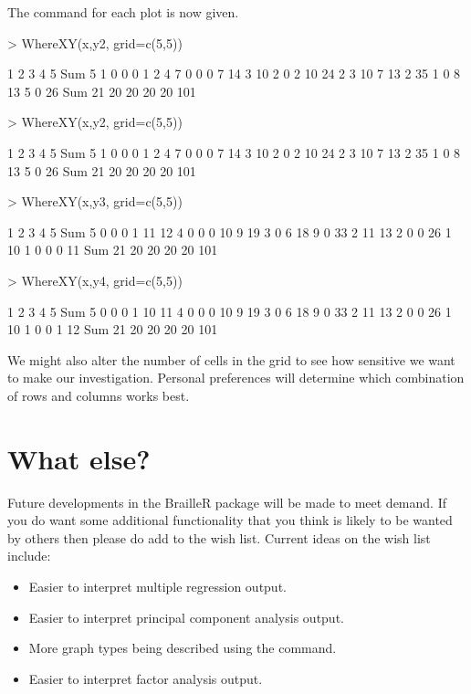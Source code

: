 The  command for each plot is now given.
\begin{Schunk}
\begin{Sinput}
> WhereXY(x,y2, grid=c(5,5))
\end{Sinput}
\begin{Soutput}
     1  2  3  4  5 Sum
5    1  0  0  0  1   2
4    7  0  0  0  7  14
3   10  2  0  2 10  24
2    3 10  7 13  2  35
1    0  8 13  5  0  26
Sum 21 20 20 20 20 101
\end{Soutput}
\begin{Sinput}
> WhereXY(x,y2, grid=c(5,5))
\end{Sinput}
\begin{Soutput}
     1  2  3  4  5 Sum
5    1  0  0  0  1   2
4    7  0  0  0  7  14
3   10  2  0  2 10  24
2    3 10  7 13  2  35
1    0  8 13  5  0  26
Sum 21 20 20 20 20 101
\end{Soutput}
\begin{Sinput}
> WhereXY(x,y3, grid=c(5,5))
\end{Sinput}
\begin{Soutput}
     1  2  3  4  5 Sum
5    0  0  0  1 11  12
4    0  0  0 10  9  19
3    0  6 18  9  0  33
2   11 13  2  0  0  26
1   10  1  0  0  0  11
Sum 21 20 20 20 20 101
\end{Soutput}
\begin{Sinput}
> WhereXY(x,y4, grid=c(5,5))
\end{Sinput}
\begin{Soutput}
     1  2  3  4  5 Sum
5    0  0  0  1 10  11
4    0  0  0 10  9  19
3    0  6 18  9  0  33
2   11 13  2  0  0  26
1   10  1  0  0  1  12
Sum 21 20 20 20 20 101
\end{Soutput}
\end{Schunk}

We might also alter the number of cells in the grid to see how sensitive we want to make our investigation. Personal preferences will determine which combination of rows and columns works best.

\section{What else?}

Future developments in the BrailleR package will be made to meet demand. If you do want some additional functionality that you think is likely to be wanted by others then please do add to the wish list. Current ideas on the wish list include:
\begin{itemize}
\item Easier to interpret multiple regression output.
\item Easier to interpret principal component analysis output.
\item More graph types being described using the  command.
\item Easier to interpret factor analysis output.
\end{itemize}





